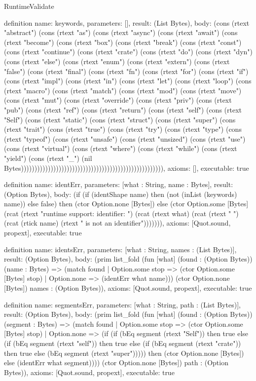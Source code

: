 \begin{lexlean}{RuntimeValidate}
\begin{semanticmodule}
definition{
  name: keywords,
  parameters: [],
  result: (List Bytes),
  body: (cons (rtext "abstract") (cons (rtext "as") (cons (rtext "async") (cons (rtext "await") (cons (rtext "become") (cons (rtext "box") (cons (rtext "break") (cons (rtext "const") (cons (rtext "continue") (cons (rtext "crate") (cons (rtext "do") (cons (rtext "dyn") (cons (rtext "else") (cons (rtext "enum") (cons (rtext "extern") (cons (rtext "false") (cons (rtext "final") (cons (rtext "fn") (cons (rtext "for") (cons (rtext "if") (cons (rtext "impl") (cons (rtext "in") (cons (rtext "let") (cons (rtext "loop") (cons (rtext "macro") (cons (rtext "match") (cons (rtext "mod") (cons (rtext "move") (cons (rtext "mut") (cons (rtext "override") (cons (rtext "priv") (cons (rtext "pub") (cons (rtext "ref") (cons (rtext "return") (cons (rtext "self") (cons (rtext "Self") (cons (rtext "static") (cons (rtext "struct") (cons (rtext "super") (cons (rtext "trait") (cons (rtext "true") (cons (rtext "try") (cons (rtext "type") (cons (rtext "typeof") (cons (rtext "unsafe") (cons (rtext "unsized") (cons (rtext "use") (cons (rtext "virtual") (cons (rtext "where") (cons (rtext "while") (cons (rtext "yield") (cons (rtext "_") (nil Bytes))))))))))))))))))))))))))))))))))))))))))))))))))))),
  axioms: [],
  executable: true
}

definition{
  name: identErr,
  parameters: [what : String, name : Bytes],
  result: (Option Bytes),
  body: (if (if (identShape name) then (not (inList (keywords) name)) else false) then (ctor Option.none [Bytes]) else (ctor Option.some [Bytes] (rcat (rtext "runtime support: identifier: ") (rcat (rtext what) (rcat (rtext " ") (rcat (rtick name) (rtext " is not an identifier"))))))),
  axioms: [Quot.sound, propext],
  executable: true
}

definition{
  name: identsErr,
  parameters: [what : String, names : (List Bytes)],
  result: (Option Bytes),
  body: (prim list_fold (fun [what] (found : (Option Bytes)) (name : Bytes) => (match found
    | Option.some stop => (ctor Option.some [Bytes] stop)
    | Option.none => (identErr what name))) (ctor Option.none [Bytes]) names : (Option Bytes)),
  axioms: [Quot.sound, propext],
  executable: true
}

definition{
  name: segmentsErr,
  parameters: [what : String, path : (List Bytes)],
  result: (Option Bytes),
  body: (prim list_fold (fun [what] (found : (Option Bytes)) (segment : Bytes) => (match found
    | Option.some stop => (ctor Option.some [Bytes] stop)
    | Option.none => (if (if (bEq segment (rtext "Self")) then true else (if (bEq segment (rtext "self")) then true else (if (bEq segment (rtext "crate")) then true else (bEq segment (rtext "super"))))) then (ctor Option.none [Bytes]) else (identErr what segment)))) (ctor Option.none [Bytes]) path : (Option Bytes)),
  axioms: [Quot.sound, propext],
  executable: true
}


\end{semanticmodule}
\end{lexlean}
